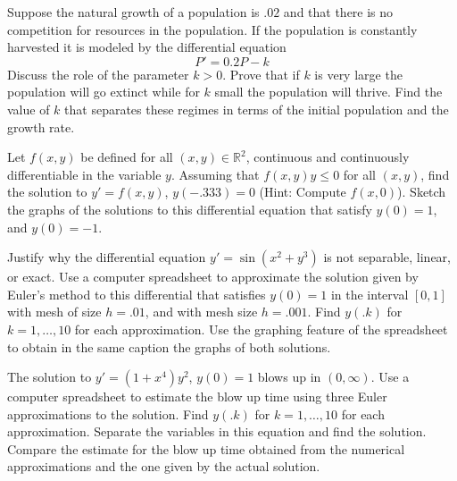 \documentclass[12pt,letterpaper]{hmcpset}
\newcommand{\RR}{\mathbb{R}}
\begin{document}
\begin{solution}
    \vfill
\end{solution}
\clearpage

\begin{problem}[C5]
    Suppose the natural growth of a population is $.02$
    and that there is no competition for resources in
    the population. If the population is constantly 
    harvested it is modeled by the differential equation
    \[
        P' = 0.2P - k
    \]
    Discuss the role of the parameter $k > 0$. Prove that 
    if $k$ is very large the population will go extinct 
    while for $k$ small the population will thrive. Find
    the value of $k$ that separates these regimes in terms
    of the initial population and the growth rate.
\end{problem}

\begin{solution}
    \vfill
\end{solution}
\clearpage

\begin{problem}[C6]
    Let $f(x, y)$ be defined for all $(x, y)\in\RR^2$,
    continuous and continuously differentiable in the
    variable $y$. Assuming that $f(x, y)y \leq 0$ for
    all $(x, y)$, find the solution to $y' = f(x, y)$, 
    $y(-.333) = 0$ (Hint: Compute $f(x, 0)$). Sketch
    the graphs of the solutions to this differential 
    equation that satisfy $y(0) = 1$, and $y(0) = -1$.
\end{problem}

\begin{solution}
    \vfill
\end{solution}
\clearpage

\begin{problem}[C7]
    Justify why the differential equation $y' = 
    \sin(x^2+y^3)$ is not separable, linear, or exact.
    Use a computer spreadsheet to approximate the solution
    given by Euler’s method to this differential that
    satisfies $y(0) = 1$ in the interval $[0, 1]$ with 
    mesh of size $h = .01$, and with mesh size $h = .001$.
    Find $y(.k)$ for $k = 1,\dots,10$ for each approximation. 
    Use the graphing feature of the spreadsheet to obtain 
    in the same caption the graphs of both solutions.
\end{problem}

\begin{solution}
    \vfill
\end{solution}
\clearpage

\begin{problem}[C8]
    The solution to $y'=(1+x^4)y^2$, $y(0) = 1$ blows up in
    $(0,\infty)$. Use a computer spreadsheet to estimate
    the blow up time using three Euler approximations to the 
    solution. Find $y(.k)$ for $k = 1,\dots,10$ for each
    approximation. Separate the variables in this equation and 
    find the solution. Compare the estimate for the blow up 
    time obtained from the numerical approximations and the 
    one given by the actual solution.
\end{problem}

\begin{solution}
    \vfill
\end{solution}
\clearpage
\end{document}
